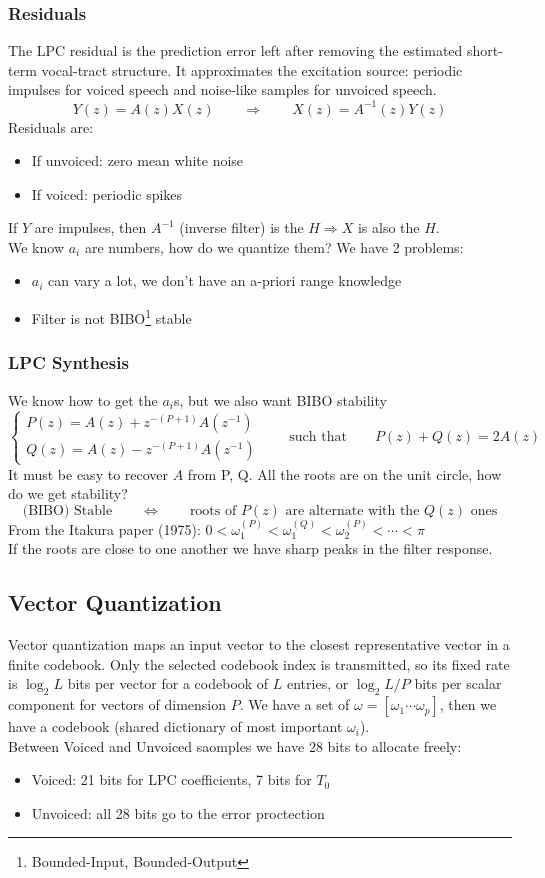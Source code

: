 \subsubsection{Residuals}
The LPC residual is the prediction error left after removing the estimated short-term vocal-tract structure. It approximates the excitation source: periodic impulses for voiced speech and noise-like samples for unvoiced speech.
$$Y(z) = A(z)X(z) \qquad \Longrightarrow \qquad X(z) = A^{-1}(z)Y(z)$$
Residuals are:
\begin{itemize}
    \item If unvoiced: zero mean white noise
    \item If voiced: periodic spikes
\end{itemize}
If $Y$ are impulses, then $A^{-1}$ (inverse filter) is the $H \Longrightarrow X$ is also the $H$.\\
We know $a_i$ are numbers, how do we quantize them? We have 2 problems:
\begin{itemize}
    \item $a_i$ can vary a lot, we don't have an a-priori range knowledge
    \item Filter is not BIBO\footnote{Bounded-Input, Bounded-Output} stable
\end{itemize}
\subsubsection{LPC Synthesis}
We know how to get the $a_i$s, but we also want BIBO stability
$$\begin{cases}
    P(z) = A(z) + z^{-(P+1)}A(z^{-1})\\
    Q(z) = A(z) - z^{-(P+1)}A(z^{-1})
\end{cases} \qquad \text{such that} \qquad P(z) + Q(z) = 2A(z)$$
It must be easy to recover $A$ from P, Q. All the roots are on the unit circle, how do we get stability?
$$\text{(BIBO) Stable} \qquad \Longleftrightarrow \qquad \text{roots of }P(z)\text{ are alternate with the }Q(z)\text{ ones}$$
From the Itakura paper (1975): $0 < \omega_1^{(P)} < \omega_1^{(Q)} < \omega_2^{(P)} < \cdots <\pi$\\
If the roots are close to one another we have sharp peaks in the filter response.
\subsection{Vector Quantization}
Vector quantization maps an input vector to the closest representative vector in a finite codebook. Only the selected codebook index is transmitted, so its fixed rate is $\log_2 L$ bits per vector for a codebook of $L$ entries, or $\log_2 L/P$ bits per scalar component for vectors of dimension $P$.
We have a set of $\omega = [\omega_1\cdots \omega_p]$, then we have a codebook (shared dictionary of most important $\omega_i$).\\
Between Voiced and Unvoiced saomples we have $28$ bits to allocate freely:
\begin{itemize}
    \item Voiced: 21 bits for LPC coefficients, 7 bits for $T_0$
    \item Unvoiced: all 28 bits go to the error proctection
\end{itemize}
